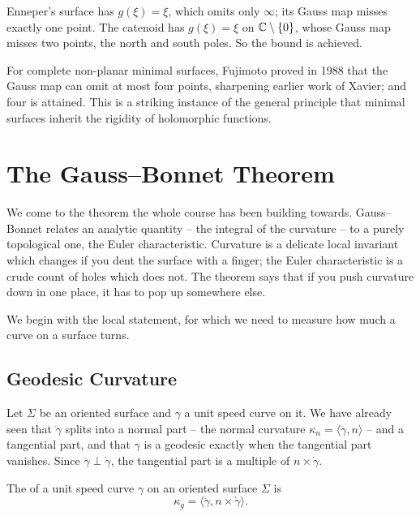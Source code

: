 \documentclass[a4paper]{scrartcl}
\begin{document}
\begin{example}
    Enneper's surface has $g(\xi) = \xi$, which omits only $\infty$; its Gauss map misses exactly one point. The catenoid has $g(\xi) = \xi$ on $\mathbb{C} \setminus\{0\}$, whose Gauss map misses two points, the north and south poles. So the bound is achieved.
\end{example}

\begin{remark}
    For complete non-planar minimal surfaces, Fujimoto proved in 1988 that the Gauss map can omit at most four points, sharpening earlier work of Xavier; and four is attained. This is a striking instance of the general principle that minimal surfaces inherit the rigidity of holomorphic functions.
\end{remark}

\section{The Gauss--Bonnet Theorem}

We come to the theorem the whole course has been building towards. Gauss--Bonnet relates an analytic quantity -- the integral of the curvature -- to a purely topological one, the Euler characteristic. Curvature is a delicate local invariant which changes if you dent the surface with a finger; the Euler characteristic is a crude count of holes which does not. The theorem says that if you push curvature down in one place, it has to pop up somewhere else.

We begin with the local statement, for which we need to measure how much a curve on a surface turns.

\subsection{Geodesic Curvature}

Let $\Sigma$ be an oriented surface and $\gamma$ a unit speed curve on it. We have already seen that $\ddot\gamma$ splits into a normal part -- the normal curvature $\kappa_n = \langle \ddot\gamma, n\rangle$ -- and a tangential part, and that $\gamma$ is a geodesic exactly when the tangential part vanishes. Since $\ddot\gamma \perp \dot\gamma$, the tangential part is a multiple of $n \times \dot\gamma$.

\begin{definition}
    The  of a unit speed curve $\gamma$ on an oriented surface $\Sigma$ is
    $$
    \kappa_g = \langle \ddot\gamma, n\times\dot\gamma\rangle.
    $$
\end{definition}
\end{document}
